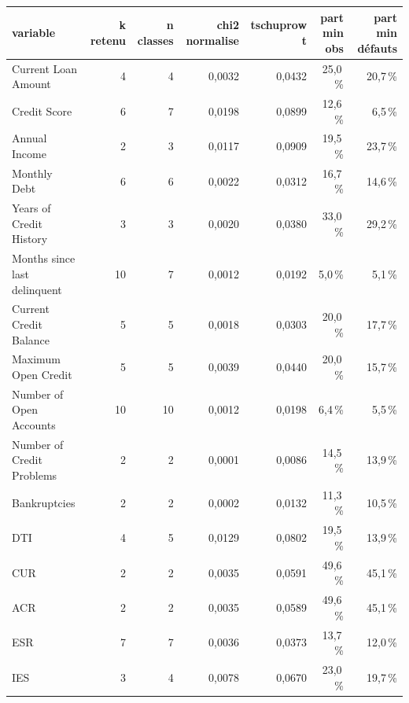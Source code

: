 \begin{tabular}{lrrrrrr}
\toprule
\textbf{variable} & \textbf{k retenu} & \textbf{n classes} & \textbf{chi2 normalise} & \textbf{tschuprow t} & \textbf{part min obs} & \textbf{part min défauts} \\
\midrule
Current Loan Amount & 4 & 4 & 0,0032 & 0,0432 & 25,0\,\% & 20,7\,\% \\
Credit Score & 6 & 7 & 0,0198 & 0,0899 & 12,6\,\% & 6,5\,\% \\
Annual Income & 2 & 3 & 0,0117 & 0,0909 & 19,5\,\% & 23,7\,\% \\
Monthly Debt & 6 & 6 & 0,0022 & 0,0312 & 16,7\,\% & 14,6\,\% \\
Years of Credit History & 3 & 3 & 0,0020 & 0,0380 & 33,0\,\% & 29,2\,\% \\
Months since last delinquent & 10 & 7 & 0,0012 & 0,0192 & 5,0\,\% & 5,1\,\% \\
Current Credit Balance & 5 & 5 & 0,0018 & 0,0303 & 20,0\,\% & 17,7\,\% \\
Maximum Open Credit & 5 & 5 & 0,0039 & 0,0440 & 20,0\,\% & 15,7\,\% \\
Number of Open Accounts & 10 & 10 & 0,0012 & 0,0198 & 6,4\,\% & 5,5\,\% \\
Number of Credit Problems & 2 & 2 & 0,0001 & 0,0086 & 14,5\,\% & 13,9\,\% \\
Bankruptcies & 2 & 2 & 0,0002 & 0,0132 & 11,3\,\% & 10,5\,\% \\
DTI & 4 & 5 & 0,0129 & 0,0802 & 19,5\,\% & 13,9\,\% \\
CUR & 2 & 2 & 0,0035 & 0,0591 & 49,6\,\% & 45,1\,\% \\
ACR & 2 & 2 & 0,0035 & 0,0589 & 49,6\,\% & 45,1\,\% \\
ESR & 7 & 7 & 0,0036 & 0,0373 & 13,7\,\% & 12,0\,\% \\
IES & 3 & 4 & 0,0078 & 0,0670 & 23,0\,\% & 19,7\,\% \\
\bottomrule
\end{tabular}
